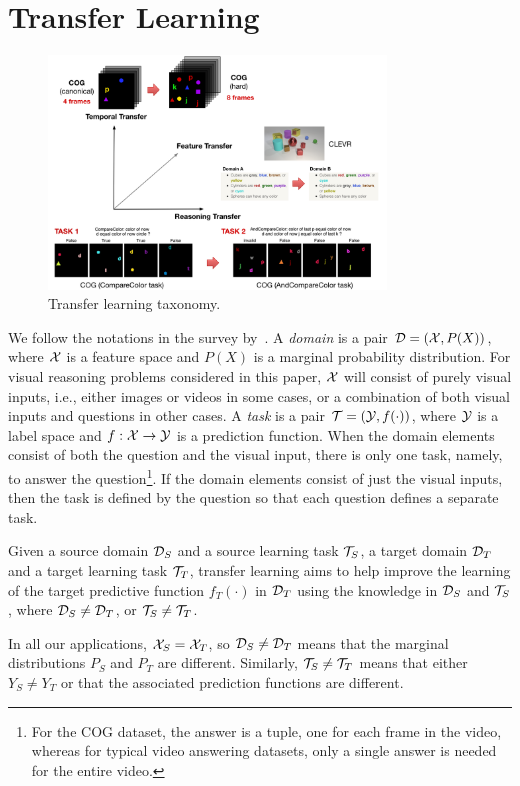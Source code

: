 \section{Transfer Learning}

\begin{figure}
	\centering
	\includegraphics[width=0.8\textwidth]{img/architecture/transfer_taxo2}
	\caption{Transfer learning taxonomy.}\label{fig:taskonomy}
\end{figure}

We follow the notations in the survey by~\cite{pan2009survey}.
A \emph{domain} is a pair $\mathcal{D} = (\mathcal{X},P(X))$, where $\mathcal{X}$ is a feature space and $P(X)$ is a marginal probability distribution.
For visual reasoning problems considered in this paper, 
$\mathcal{X}$ will consist of purely visual inputs, i.e., either images or videos in some cases, or 
a combination of both visual inputs and questions in other cases. 
A \emph{task} is a pair $\mathcal{T}= (\mathcal{Y},f(\cdot))$, where $\mathcal{Y}$ is a label space and $f: \mathcal{X} \to \mathcal{Y}$ is a prediction function. 
When the domain elements consist of both the question and the visual input, there is only one task, namely, to answer the 
question\footnote{%
	For the COG dataset, the answer is a tuple, one for each frame in the video, whereas for typical video answering datasets,
	only a single answer is needed for the entire video.}. %
If the domain elements consist of just the visual inputs, then the task is defined by the question so that each question 
defines a separate task.
\begin{definition}
	\label{defn:transfer}
	Given a source domain $\mathcal{D}_S$ and a source learning task $\mathcal{T}_S$, a target domain $\mathcal{D}_T$ and a target learning task $\mathcal{T}_T$, transfer learning aims to help improve the 
	learning of the target predictive function $f_T(\cdot)$ in $\mathcal{D}_T$ using the knowledge  in $\mathcal{D}_S$ and $\mathcal{T}_S$, where $\mathcal{D}_S \ne \mathcal{D}_T$, or $\mathcal{T}_S \ne \mathcal{T}_T$.
\end{definition}
In all our applications, $\mathcal{X}_S = \mathcal{X}_T$, so $\mathcal{D}_S \ne \mathcal{D}_T$ means that the marginal distributions $P_S$ and $P_T$ are different.
Similarly, $\mathcal{T}_S \ne \mathcal{T}_T$ means that either $Y_S \ne Y_T$ or that the associated prediction functions are different.

